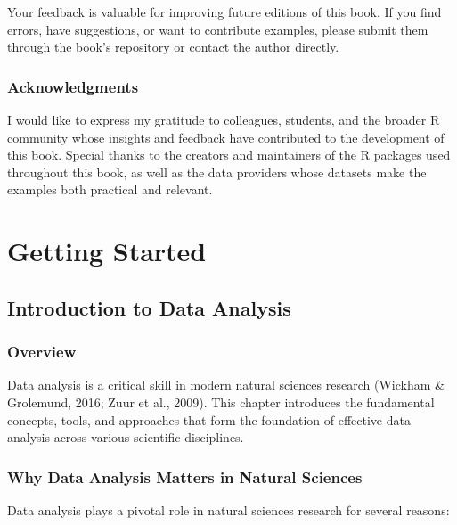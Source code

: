 \documentclass[
  letterpaper,
]{book}
\begin{document}

Your feedback is valuable for improving future editions of this book. If
you find errors, have suggestions, or want to contribute examples,
please submit them through the book's repository or contact the author
directly.

\section*{Acknowledgments}\label{acknowledgments-1}


I would like to express my gratitude to colleagues, students, and the
broader R community whose insights and feedback have contributed to the
development of this book. Special thanks to the creators and maintainers
of the R packages used throughout this book, as well as the data
providers whose datasets make the examples both practical and relevant.

\part{Getting Started}

\chapter{Introduction to Data
Analysis}\label{introduction-to-data-analysis}

\section{Overview}\label{overview}

Data analysis is a critical skill in modern natural sciences research
(Wickham \& Grolemund, 2016; Zuur et al., 2009). This chapter introduces
the fundamental concepts, tools, and approaches that form the foundation
of effective data analysis across various scientific disciplines.

\section{Why Data Analysis Matters in Natural
Sciences}\label{why-data-analysis-matters-in-natural-sciences}

Data analysis plays a pivotal role in natural sciences research for
several reasons:
\end{document}
